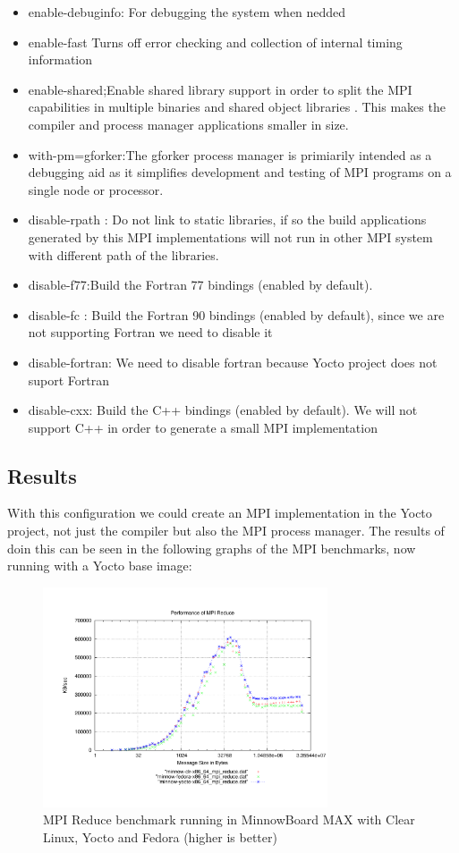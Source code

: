 \begin{itemize}
\item enable-debuginfo: For debugging the system when nedded
\item enable-fast Turns off error checking and collection of internal timing
information
\item enable-shared;Enable shared library support in order to split the MPI
capabilities in multiple binaries and shared object libraries . This makes the
compiler and process manager applications smaller in size.
\item with-pm=gforker:The gforker process manager is primiarily intended as a
debugging aid as it simplifies development and testing of MPI programs on a
single node or processor.
\item disable-rpath : Do not link to static libraries, if so the build
applications generated by this MPI implementations will not run in other MPI
system with different path of the libraries.
\item disable-f77:Build the Fortran 77 bindings (enabled by default).
\item disable-fc : Build the Fortran 90 bindings (enabled by default), since we
are not supporting Fortran we need to disable it 
\item disable-fortran: We need to disable fortran because Yocto project does
not suport Fortran
\item disable-cxx: Build the C++ bindings (enabled by default). We will not
support C++ in order to generate a small MPI implementation
\end{itemize}


\subsection{Results}

With this configuration we could create an MPI implementation in the Yocto
project, not just the compiler but also the MPI process manager. The results of
doin this can be seen in the following graphs of the MPI benchmarks, now
running with a Yocto base image: 

\begin{figure}[H]
\centering
\includegraphics[width=0.75\textwidth]{images/mpbench_yocto_experiments/mpi_reduce.pdf}
\caption{MPI Reduce benchmark running in MinnowBoard MAX with Clear Linux, Yocto
and Fedora (higher is better)}
\label{mpi_reduce_yocto}
\end{figure}

